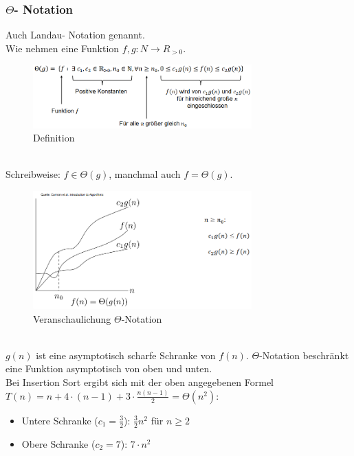 \documentclass{article}
\begin{document}
            \subsubsection{$\Theta$- Notation}
                Auch Landau- Notation genannt.\\
                Wie nehmen eine Funktion $f,g: N \rightarrow R_{>0}$.\\
                \begin{figure}[ht]
                    \centering
                    \includegraphics[width=0.75\textwidth]{Bilder/ThetaN.png}
                    \caption{Definition}
                    \label{fig:ThetaN}
                \end{figure}\\
                Schreibweise: $f\in \Theta(g)$, manchmal auch $f= \Theta(g)$.\\
                \begin{figure}[ht]
                    \centering
                    \includegraphics[width=0.75\textwidth]{Bilder/VeranschaulichungT.png}
                    \caption{Veranschaulichung $\Theta$-Notation}
                    \label{fig:VeranschaulichungTheta}
                \end{figure}\\
                \newpage
                $g(n)$ ist eine asymptotisch scharfe Schranke von $f(n)$. $\Theta$-Notation beschränkt eine Funktion asymptotisch von oben und unten.\\
                Bei Insertion Sort ergibt sich mit der oben angegebenen Formel $T(n)=n+4\cdot (n-1)+3\cdot \frac{n(n-1)}{2}=\Theta(n^2)$:
                \begin{itemize}
                    \item Untere Schranke ($c_1=\frac{3}{2}$): $\frac{3}{2}n^2$ für $n\geq 2$
                    \item Obere Schranke ($c_2=7$): $7\cdot n^2$
                \end{itemize} 
\end{document}
